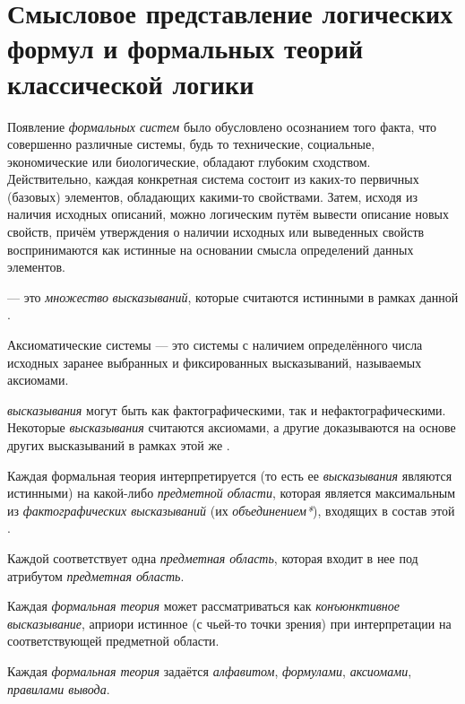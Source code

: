 \section{Смысловое представление логических формул и формальных теорий классической логики}
Появление \textit{формальных систем} было обусловлено осознанием того факта, что совершенно различные системы, будь то технические, социальные, экономические или биологические, обладают глубоким сходством. Действительно, каждая конкретная система состоит из каких-то первичных (базовых) элементов, обладающих какими-то свойствами. Затем, исходя из наличия исходных описаний, можно логическим путём вывести описание новых свойств, причём утверждения о наличии исходных или выведенных свойств воспринимаются как истинные на основании смысла определений данных элементов.

 --- это \textit{множество} \textit{высказываний}, которые считаются истинными в рамках данной .

Аксиоматические системы --- это системы с наличием определённого числа исходных заранее выбранных и фиксированных высказываний, называемых аксиомами.

\textit{высказывания} могут быть как фактографическими, так и нефактографическими. Некоторые \textit{высказывания} считаются аксиомами, а другие доказываются на основе других высказываний в рамках этой же .

Каждая формальная теория интерпретируется (то есть ее \textit{высказывания} являются истинными) на какой-либо \textit{предметной области}, которая является максимальным из \textit{фактографических высказываний} (их \textit{объединением*}),  входящих в состав этой .

Каждой  соответствует одна \textit{предметная область}, которая входит в нее под атрибутом \textit{предметная область\scnrolesign}.

Каждая \textit{формальная теория} может рассматриваться как \textit{конъюнктивное высказывание}, априори истинное (с чьей-то точки зрения) при интерпретации на соответствующей предметной области.

Каждая \textit{формальная теория} задаётся \textit{алфавитом}, \textit{формулами}, \textit{аксиомами}, \textit{правилами вывода}.


